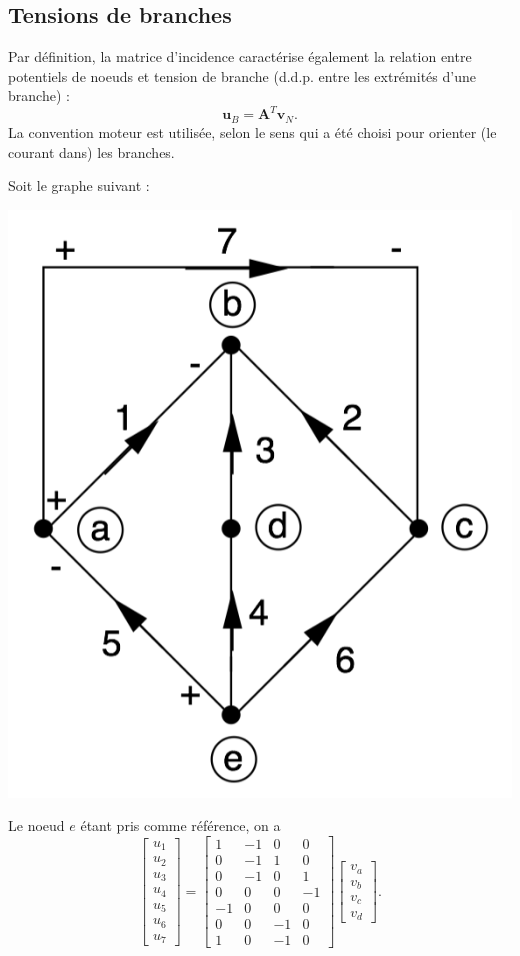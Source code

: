 \subsection{Tensions de branches}
Par définition, la matrice d'incidence caractérise également la relation entre potentiels de noeuds et tension de branche (d.d.p. entre les extrémités d'une branche) : 
$$\mathbf{u}_B = \mathbf{A}^T \mathbf{v}_{N}.$$
La convention moteur est utilisée, selon le sens qui a été choisi pour orienter (le courant dans) les branches.

\begin{testexample}
Soit le graphe suivant : 
\begin{center}
\includegraphics[width=0.4\linewidth]{figs/methodes-generales/exemple_tension_branche}
\end{center}
Le noeud $e$ étant pris comme référence, on a 
{\small $$
\left[\begin{array}{c}
u_1 \\
u_2 \\
u_3 \\
u_4 \\
u_5 \\
u_6 \\
u_7 
\end{array}\right] = 
\left[\begin{array}{rrrr}
1 & -1 & 0 & 0\\
0 & -1 & 1 & 0\\
0 & -1 & 0 & 1\\
0 & 0 & 0 & -1\\
-1 & 0 & 0 & 0 \\
0 & 0 & -1 & 0 \\
1 & 0 & -1 & 0
\end{array}\right]
\left[\begin{array}{c}
v_a\\
v_b\\
v_c\\
v_d
\end{array}\right].$$}
\end{testexample}

